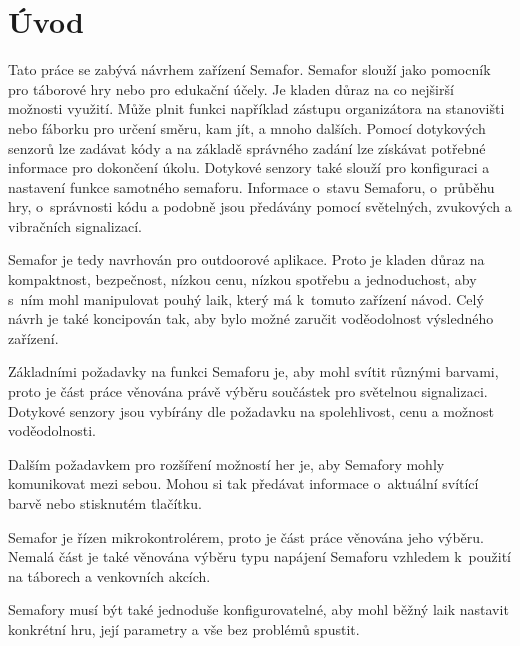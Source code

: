 \chapter*{Úvod}
{}

Tato práce se zabývá návrhem zařízení Semafor. Semafor slouží jako pomocník pro táborové hry nebo pro edukační účely. Je kladen důraz na co 
nejširší možnosti využití. Může plnit funkci například zástupu organizátora na stanovišti nebo fáborku pro určení směru, kam jít, a mnoho 
dalších. Pomocí dotykových senzorů lze zadávat kódy a na základě správného zadání lze získávat potřebné informace pro dokončení úkolu. Dotykové
senzory také slouží pro konfiguraci a nastavení funkce samotného semaforu. Informace o~stavu Semaforu, o~průběhu hry, o~správnosti kódu a podobně
jsou předávány pomocí světelných, zvukových a vibračních signalizací. 

Semafor je tedy navrhován pro outdoorové aplikace. Proto je kladen důraz na kompaktnost, bezpečnost, nízkou cenu, nízkou spotřebu a jednoduchost, 
aby s~ním mohl manipulovat pouhý laik, který má k~tomuto zařízení návod. Celý návrh je také koncipován tak, aby bylo možné zaručit voděodolnost 
výsledného zařízení. 

Základními požadavky na funkci Semaforu je, aby mohl svítit různými barvami, proto je část práce věnována právě výběru součástek pro světelnou 
signalizaci. Dotykové senzory jsou vybírány dle požadavku na spolehlivost, cenu a možnost voděodolnosti.

Dalším požadavkem pro rozšíření možností her je, aby Semafory mohly komunikovat mezi sebou. Mohou si tak předávat informace o~aktuální svítící 
barvě nebo stisknutém tlačítku. 

Semafor je řízen mikrokontrolérem, proto je část práce věnována jeho výběru. Nemalá část je také věnována výběru typu napájení Semaforu vzhledem 
k~použití na táborech a venkovních akcích.  

Semafory musí být také jednoduše konfigurovatelné, aby mohl běžný laik nastavit konkrétní hru, její parametry a vše bez problémů spustit. 



